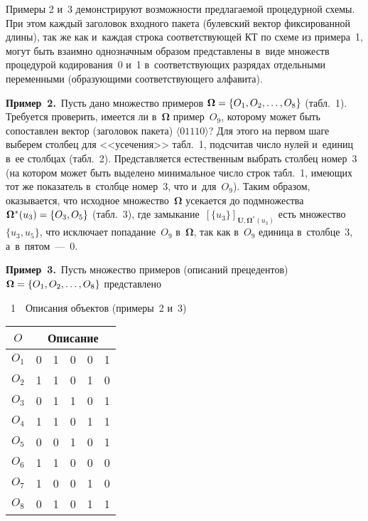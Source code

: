 \begin{multicols}{2}
    Примеры 2 и~3 демонстрируют возможности предлагаемой процедурной 
схемы. При этом каж\-дый заголовок входного пакета (булевский вектор 
фиксированной длины), так же как и~каждая строка соответствующей КТ по 
схеме из примера~1, могут быть взаимно однозначным образом 
представлены в~виде множеств процедурой кодирования~0 и~1 
в~соответствующих разрядах отдельными переменными (образующими 
соответствующего алфавита).
    
    \smallskip
    
    \noindent
    \textbf{Пример~2.}\ Пусть дано множество примеров ${\boldsymbol{\Omega}}\hm = \{O_1, 
O_2, \ldots, O_8\}$ (табл.~1). Требуется проверить, имеется ли 
в~${\boldsymbol{\Omega}}$ пример~$O_9$, которому может быть сопоставлен вектор 
(заголовок пакета) $\langle01110\rangle$? Для этого на первом шаге выберем 
столбец для <<усечения>> табл.~1, подсчитав число нулей и~единиц в~ее 
столбцах (табл.~2). Представляется естественным выбрать столбец номер~3 
(на котором может быть выделено минимальное число строк табл.~1, 
имеющих тот же показатель в~столбце номер~3, что и~для~$O_9$). Таким 
образом, оказывается, что исходное множество~${\boldsymbol{\Omega}}$ усекается до 
подмножества ${\boldsymbol{\Omega}}^*(u_3)\hm=\{O_3,O_5\}$ (табл.~3), где 
замыкание~$[\{u_3\}]_{\mathbf{U},{\boldsymbol{\Omega}}^*(u_3)}$ есть множество $\{u_3, u_5\}$, 
что исключает попадание~$O_9$ в~${\boldsymbol{\Omega}}$, так как  
в~$O_9$ единица в~столбце~3,  
а~в~пятом~---~0.

     \noindent
     \textbf{Пример~3.}\ Пусть множество примеров (описаний 
прецедентов) ${\boldsymbol{\Omega}}\hm= \{O_1, O_2, \ldots, O_8\}$ представлено\linebreak\vspace*{-12pt}

\pagebreak

\noindent
{\small
 \begin{center}  %
 \parbox{46mm}{{\tablename~1}\ \ \small{Описания объектов (примеры~2 и~3)}}
 
 \vspace*{2ex}
  
     \tabcolsep=8pt
     \begin{tabular}{|c|c|c|c|c|c|}
     \hline
     $O$ &\multicolumn{5}{c|}{Описание}\\
     \hline
      $O_1$&0&1&0&0&1\\
$O_2$&1&1&0&1&0\\
     $O_3$&0&1&1&0&1\\
      $O_4$&1&1&0&1&1\\
      $O_5$&0&0&1&0&1\\
$O_6$&1&1&0&0&0\\
      $O_7$&1&0&0&1&0\\
      $O_8$&0&1&0&1&1\\
      \hline
      \end{tabular}
\end{center}
}


\end{multicols}
